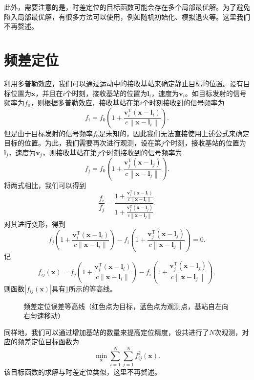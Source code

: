 此外，需要注意的是，时差定位的目标函数可能会存在多个局部最优解。为了避免陷入局部最优解，有很多方法可以使用，例如随机初始化、模拟退火等。这里我们不再赘述。

\section{频差定位}
利用多普勒效应，我们可以通过运动中的接收基站来确定静止目标的位置。设有目标位置为\( \bm{x} \)，并且在\( i \)个时刻，接收基站的位置为\( \bm{l}_i \)，速度为\( \bm{v}_i \)。如目标发射的信号频率为\( f_0 \)，则根据多普勒效应，接收基站在第\( i \)个时刻接收到的信号频率为
\[
    f_i = f_0 \left(1 + \frac{\bm{v}_i^{\mathrm{T}} (\bm{x} - \bm{l}_i)}{c\left\| \bm{x} - \bm{l}_i \right\|}\right).
\]
但是由于目标发射的信号频率\( f_0 \)是未知的，因此我们无法直接使用上述公式来确定目标的位置。为此，我们需要再次进行观测，设在第\( j \)个时刻，接收基站的位置为\( \bm{l}_j \)，速度为\( \bm{v}_j \)，则接收基站在第\( j \)个时刻接收到的信号频率为
\[
    f_j = f_0 \left(1 + \frac{\bm{v}_j^{\mathrm{T}} (\bm{x} - \bm{l}_j)}{c\left\| \bm{x} - \bm{l}_j \right\|}\right).
\]
将两式相比，我们可以得到
\[
    \frac{f_i}{f_j} = \frac{1 + \frac{\bm{v}_i^{\mathrm{T}} (\bm{x} - \bm{l}_i)}{c\left\| \bm{x} - \bm{l}_i \right\|}}{1 + \frac{\bm{v}_j^{\mathrm{T}} (\bm{x} - \bm{l}_j)}{c\left\| \bm{x} - \bm{l}_j \right\|}}.
\]
对其进行变形，得到
\[
    f_j \left(1 + \frac{\bm{v}_i^{\mathrm{T}} (\bm{x} - \bm{l}_i)}{c\left\| \bm{x} - \bm{l}_i \right\|}\right) - f_i \left(1 + \frac{\bm{v}_j^{\mathrm{T}} (\bm{x} - \bm{l}_j)}{c \left\| \bm{x} - \bm{l}_j \right\|}\right) = 0.
\]
记
\[
    f_{ij}(\bm{x}) = f_j \left(1 + \frac{\bm{v}_i^{\mathrm{T}} (\bm{x} - \bm{l}_i)}{c\left\| \bm{x} - \bm{l}_i \right\|}\right) - f_i \left(1 + \frac{\bm{v}_j^{\mathrm{T}} (\bm{x} - \bm{l}_j)}{c \left\| \bm{x} - \bm{l}_j \right\|}\right),
\]
则函数\( |f_{ij}(\bm{x})| \)具有\cref{fig_fdoa}所示的等高线。

\begin{figure}[htb!]
    \centering
    \caption{频差定位误差等高线（红色点为目标，蓝色点为观测点，基站自左向右匀速移动）}
    \label{fig_fdoa}
\end{figure}

同样地，我们可以通过增加基站的数量来提高定位精度，设共进行了\( N \)次观测，对应的频差定位目标函数为
\[
    \min_{\bm{x}} \sum_{i=1}^{N} \sum_{j=1}^{N} f_{ij}^2(\bm{x}).
\]
该目标函数的求解与时差定位类似，这里不再赘述。
